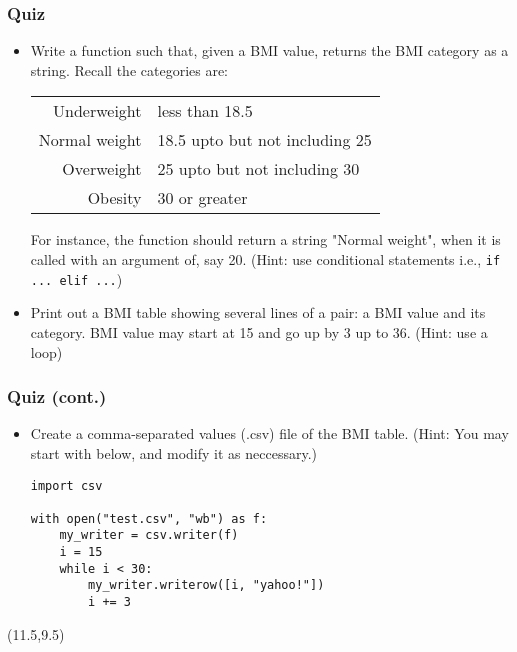 \documentclass{beamer}
\begin{document}
\begin{frame}[fragile]
\frametitle{Quiz}
\begin{itemize}
\item Write a function such that, given a BMI value, 
    returns the BMI category as a string. Recall the
    categories are:
{\tiny
\begin{table}[h]
\begin{tabular}{r l}
Underweight & less than 18.5 \\ 
Normal weight & 18.5 upto but not including 25 \\
Overweight & 25 upto but not including 30 \\
Obesity & 30 or greater \\
\end{tabular}
\end{table}
}
For instance, the function should return a string 
"Normal weight", when it is called with an argument
of, say 20. (Hint: use conditional statements 
i.e., \lstinline{if ... elif ...})
 
\item Print out a BMI table showing several lines of
    a pair: a BMI value and its category. BMI value
    may start at 15 and go up by 3 up to 36.
    (Hint: use a loop)
\end{itemize}
\end{frame}

\begin{frame}[fragile]
\frametitle{Quiz (cont.)}
\begin{itemize}
\item Create a comma-separated values (.csv) file
    of the BMI table. (Hint: You may start with below,
    and modify it as neccessary.) 
\begin{lstlisting}
import csv

with open("test.csv", "wb") as f:
    my_writer = csv.writer(f)
    i = 15
    while i < 30:
        my_writer.writerow([i, "yahoo!"])
        i += 3 
\end{lstlisting}
\end{itemize}

\begin{textblock}{5}(11.5,9.5)
\end{textblock}

\end{frame}
\end{document}
